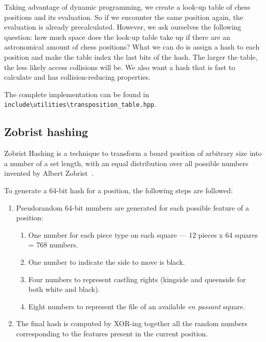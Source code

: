 \noindent Taking advantage of dynamic programming, we create a look-up table of chess positions and its evaluation. So if we encounter the same position again, the evaluation is already precalculated. However, we ask ourselves the following question: how much space does the look-up table take up if there are an astronomical amount of chess positions? What we can do is assign a hash to each position and make the table index the last bits of the hash. The larger the table, the less likely access collisions will be. We also want a hash that is fast to calculate and has collision-reducing properties.
~\cite{TranspositionTable}

\vspace{1em}

\noindent \parbox{\textwidth}{The complete implementation can be found in\\\texttt{include\textbackslash{}utilities\textbackslash{}transposition\_table.hpp}.}

\subsection*{Zobrist hashing}

Zobrist Hashing is a technique to transform a board position of arbitrary size into a number of a set length, with an equal distribution over all possible numbers invented by Albert Zobrist~\cite{ZobristHashing}.

\vspace{1em}

\noindent To generate a 64-bit hash for a position, the following steps are followed:

\begin{enumerate}
  \item Pseudorandom 64-bit numbers are generated for each possible feature of a position:
  \begin{enumerate}
    \item One number for each piece type on each square — 12 pieces x 64 squares = 768 numbers.
    \item One number to indicate the side to move is black.
    \item Four numbers to represent castling rights (kingside and queenside for both white and black).
    \item Eight numbers to represent the file of an available \textit{en passant} square.
  \end{enumerate}
  \item The final hash is computed by XOR-ing together all the random numbers corresponding to the features present in the current position.
\end{enumerate}

